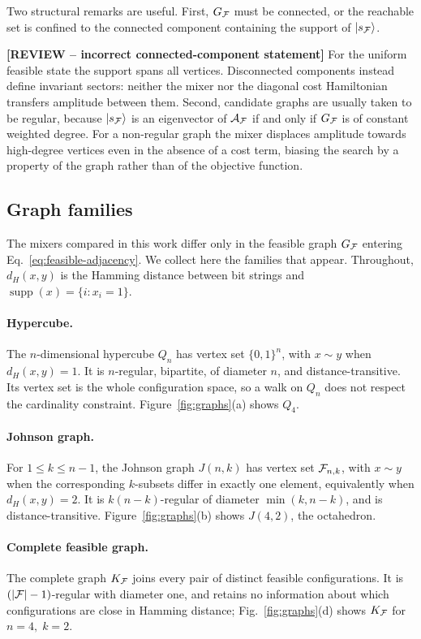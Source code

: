 Two structural remarks are useful. First, $G_{\mathcal{F}}$ must be connected, or the
reachable set is confined to the connected component containing the support of
$\ket{s_{\mathcal{F}}}$.

{\color{red}\textbf{[REVIEW -- incorrect connected-component statement]} For the uniform feasible state the support spans all vertices. Disconnected components instead define invariant sectors: neither the mixer nor the diagonal cost Hamiltonian transfers amplitude between them.} Second, candidate graphs are usually taken to be regular,
because $\ket{s_{\mathcal{F}}}$ is an eigenvector of $\mathcal{A}_{\mathcal{F}}$ if and only if
$G_{\mathcal{F}}$ is of constant weighted degree. For a non-regular graph the mixer displaces amplitude
towards high-degree vertices even in the absence of a cost term, biasing the
search by a property of the graph rather than of the objective function.

\subsection{\label{subsec:graph-zoo}Graph families}

The mixers compared in this work differ only in the feasible graph $G_{\mathcal{F}}$
entering Eq.~\eqref{eq:feasible-adjacency}. We collect here the families that
appear. Throughout, $d_H(x,y)$ is the Hamming distance between bit strings and
$\operatorname{supp}(x)=\{i:x_i=1\}$.

\paragraph*{Hypercube.} The $n$-dimensional hypercube $Q_n$ has vertex set
$\{0,1\}^{n}$, with $x\sim y$ when $d_H(x,y)=1$. It is $n$-regular,
bipartite, of diameter $n$, and distance-transitive. Its vertex set is the
whole configuration space, so a walk on $Q_n$ does not respect the
cardinality constraint. Figure~\ref{fig:graphs}(a) shows $Q_4$.

\paragraph*{Johnson graph.} For $1\le k\le n-1$, the Johnson graph $J(n,k)$
has vertex set $\mathcal{F}_{n,k}$, with $x\sim y$ when the corresponding $k$-subsets
differ in exactly one element, equivalently when $d_H(x,y)=2$. It is
$k(n-k)$-regular of diameter $\min(k,n-k)$, and is distance-transitive.
Figure~\ref{fig:graphs}(b) shows $J(4,2)$, the octahedron.

\paragraph*{Complete feasible graph.} The complete graph $K_{\mathcal{F}}$ joins every
pair of distinct feasible configurations. It is $(|\mathcal{F}|-1)$-regular with
diameter one, and retains no information about which configurations are close
in Hamming distance; Fig.~\ref{fig:graphs}(d) shows $K_{\mathcal{F}}$ for $n = 4, \; k = 2$.

